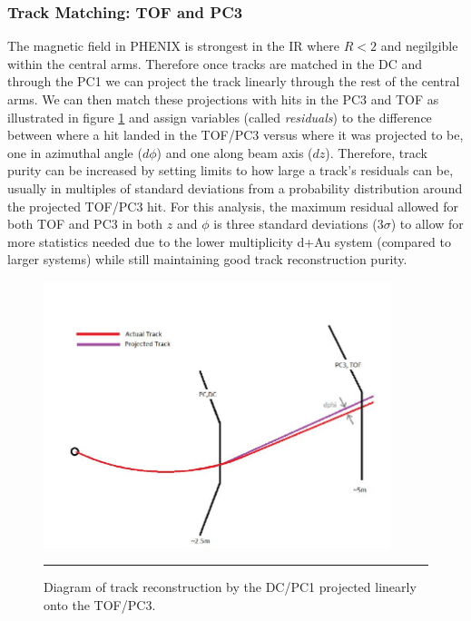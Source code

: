 \subsubsection{Track Matching: TOF and PC3}
The magnetic field in PHENIX is strongest in the IR where $R<2$ and negilgible within the central arms\citep{rolnickthesis}. Therefore once tracks are matched in the DC and through the PC1 we can project the track linearly through the rest of the central arms. We can then match these projections with hits in the PC3 and TOF as illustrated in figure \ref{fig:pc3tofmatching} and assign variables (called \textit{residuals}) to the difference between where a hit landed in the TOF/PC3 versus where it was projected to be, one in azimuthal angle ($d\phi$) and one along beam axis ($dz$). Therefore, track purity can be increased by setting limits to how large a track's residuals can be, usually in multiples of standard deviations from a probability distribution around the projected TOF/PC3 hit. For this analysis, the maximum residual allowed for both TOF and PC3 in both $z$ and $\phi$ is three standard deviations ($3\sigma$) to allow for more statistics needed due to the lower multiplicity d+Au system (compared to larger systems) while still maintaining good track reconstruction purity.
\begin{figure}[htbp!]
  \centering
    \includegraphics[width=0.9\textwidth]{Figures/pc3tofmatching.JPG}
    \rule{35em}{0.5pt}
  \caption[Diagram of track reconstruction by the DC/PC1 projected linearly onto the TOF/PC3]{Diagram of track reconstruction by the DC/PC1 projected linearly onto the TOF/PC3. \citep{schaeferthesis}}
  \label{fig:pc3tofmatching}
\end{figure}

